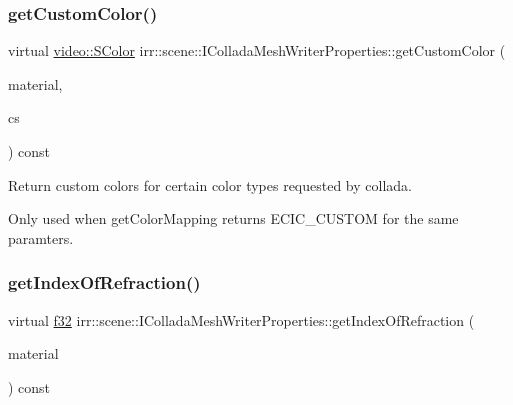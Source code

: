 \subsubsection{\texorpdfstring{get\+Custom\+Color()}{getCustomColor()}}
{\footnotesize\ttfamily virtual \hyperlink{classirr_1_1video_1_1SColor}{video\+::\+S\+Color} irr\+::scene\+::\+I\+Collada\+Mesh\+Writer\+Properties\+::get\+Custom\+Color (\begin{DoxyParamCaption}\item[{const \hyperlink{classirr_1_1video_1_1SMaterial}{video\+::\+S\+Material} \&}]{material,  }\item[{\hyperlink{namespaceirr_1_1scene_a6204218341c6b449d879cd8367b2f8d8}{E\+\_\+\+C\+O\+L\+L\+A\+D\+A\+\_\+\+C\+O\+L\+O\+R\+\_\+\+S\+A\+M\+P\+L\+ER}}]{cs }\end{DoxyParamCaption}) const\hspace{0.3cm}{\ttfamily [pure virtual]}}



Return custom colors for certain color types requested by collada. 

Only used when get\+Color\+Mapping returns E\+C\+I\+C\+\_\+\+C\+U\+S\+T\+OM for the same paramters. \mbox{\label{classirr_1_1scene_1_1IColladaMeshWriterProperties_ab7ec58f708ebebe941246e6c78b0691d}} 
\subsubsection{\texorpdfstring{get\+Index\+Of\+Refraction()}{getIndexOfRefraction()}}
{\footnotesize\ttfamily virtual \hyperlink{namespaceirr_a0277be98d67dc26ff93b1a6a1d086b07}{f32} irr\+::scene\+::\+I\+Collada\+Mesh\+Writer\+Properties\+::get\+Index\+Of\+Refraction (\begin{DoxyParamCaption}\item[{const \hyperlink{classirr_1_1video_1_1SMaterial}{video\+::\+S\+Material} \&}]{material }\end{DoxyParamCaption}) const\hspace{0.3cm}{\ttfamily [pure virtual]}}



